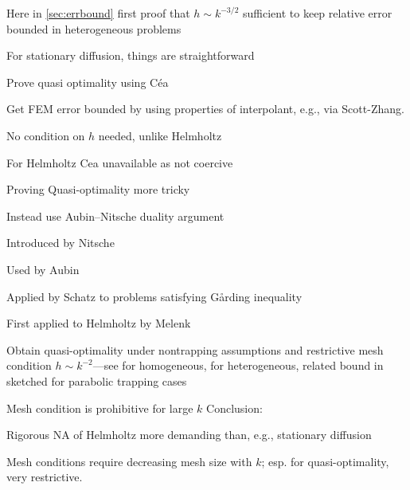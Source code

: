 \item Here in \cref{sec:errbound} first proof that $h\sim k^{-3/2}$ sufficient to keep relative error bounded in heterogeneous problems
\eit
\item For stationary diffusion, things are straightforward
\item Prove quasi optimality using C\'ea
\item Get FEM error bounded by using properties of interpolant, e.g., via Scott-Zhang.
\item No condition on $h$ needed, unlike Helmholtz
\item For Helmholtz Cea unavailable as not coercive
\item Proving Quasi-optimality more tricky
\item Instead use Aubin--Nitsche duality argument
\bit
\item Introduced by Nitsche
\item Used by Aubin
\item Applied by Schatz to problems satisfying G\r{a}rding inequality
\item First applied to Helmholtz by Melenk
\item Obtain quasi-optimality under nontrapping assumptions and restrictive mesh condition $h \sim k^{-2}$---see \cite[Proposition 8.2.7]{Me:95} for homogeneous, \cite[Theorem 3]{GaSpWu:18} for heterogeneous, related bound in \cite[Section 1.4]{ChSpGiSm:17} sketched for parabolic trapping cases
\item Mesh condition is prohibitive for large $k$
\eit
\eit
Conclusion:
\bit
\item Rigorous NA of Helmholtz more demanding than, e.g., stationary diffusion
\item Mesh conditions require decreasing mesh size with $k$; esp. for quasi-optimality, very restrictive.
\eit






